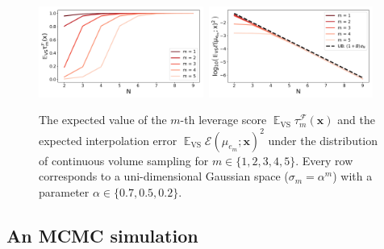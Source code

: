 \documentclass[twoside,11pt]{book}
\numberwithin{theorem}{chapter}
\numberwithin{definition}{chapter}
\numberwithin{proposition}{chapter}
\numberwithin{corollary}{chapter}
\numberwithin{example}{chapter}
\numberwithin{lemma}{chapter}
\numberwithin{assumption}{chapter}
\numberwithin{equation}{chapter}
\numberwithin{figure}{chapter}
\DeclareMathOperator{\VS}{\mathrm{VS}}
\DeclareMathOperator{\EX}{\mathbb{E}}
\DeclareMathOperator{\F}{\mathcal{F}}
\begin{document}
\begin{figure}[h]
\includegraphics[width= 0.48\textwidth]{img/icml/app/EX_VS_tau_n_alpha_02.pdf}~\includegraphics[width= 0.48\textwidth]{img/icml/app/EX_VS_err_n_alpha_02_new.pdf}\\
\caption{The expected value of the $m$-th leverage score $\EX_{\VS} \tau_{m}^{\F}(\bm{x})$ and the expected interpolation error $\EX_{\VS} \mathcal{E}(\mu_{e_{m}};\bm{x})^{2}$ under the distribution of continuous volume sampling for $m \in \{1,2,3,4,5\}$. Every row corresponds to a uni-dimensional Gaussian space ($\sigma_{m} = \alpha^{m}$) with a parameter $\alpha \in \{0.7,0.5,0.2\}$. \label{CVS_fig:gaussian}}
\end{figure}


\subsection{An MCMC simulation}
\end{document}
